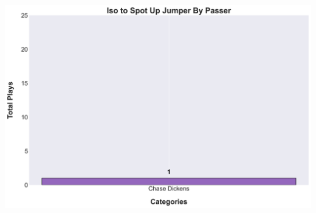 \documentclass[a4paper,12pt]{article}
\begin{document}
\begin{table}[H]
{\begin{minipage}[t]{0.6\textwidth}
{\begin{tabular}
                
            
                
            
                
            
                
            
                
            
                
            
                
            
                
            
                
            
                
            
                
            
                
            
                
            
                
            
                
            
                
            
            \bottomrule
        \end{tabular}
        } %
    \end{minipage}
    } %
    \hfill %
    \begin{minipage}[c]{0.35\textwidth} %
        \flushright
        \includegraphics[width=\textwidth, height=.14\textheight]{images/SpotUp_IsoShotsPlayer_Freq.png} %
    \end{minipage}
\end{table}
\end{document}

